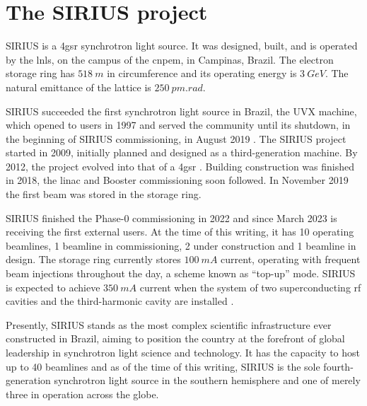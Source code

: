 \section*{The SIRIUS project}

SIRIUS is a \gls*{4gsr} synchrotron light source. It was designed, built, and is operated by the \gls*{lnls}, on the campus of the \gls*{cnpem}, in Campinas, Brazil. The electron storage ring has $518~\unit{m}$ in circumference and its operating energy is $3~\unit{GeV}$. The natural emittance of the lattice is $250~\unit{pm}.\unit{rad}$.

SIRIUS succeeded the first synchrotron light source in Brazil, the UVX machine, which opened to users in 1997 and served the community until its shutdown, in the beginning of SIRIUS commissioning, in August 2019
\cite{liu_synchrotron_2019}. The SIRIUS project started in 2009, initially planned and designed as a third-generation machine. By 2012, the project evolved into that of a \gls*{4gsr} \cite{liu_synchrotron_2019}. Building construction was finished in 2018, the \acrshort*{linac} and Booster commissioning soon followed. In November 2019 the first beam was stored in the storage ring.

SIRIUS finished the Phase-0 commissioning in 2022 and since March 2023 is receiving the first external users. At the time of this writing, it has 10 operating beamlines, 1 beamline in commissioning, 2 under construction and 1 beamline in design\cite{lnls_beamlines}. The storage ring currently stores $100~\unit{mA}$ current, operating with frequent beam injections throughout the day, a scheme known as ``top-up'' mode. SIRIUS is expected to achieve $350~\unit{mA}$ current when the system of two superconducting \gls*{rf} cavities and the third-harmonic cavity are installed \cite{liu_status_2022,liu_status_2023}.

Presently, SIRIUS stands as the most complex scientific infrastructure ever constructed in Brazil, aiming to position the country at the forefront of global leadership in synchrotron light science and technology. It has the capacity to host up to 40 beamlines and as of the time of this writing, SIRIUS is the sole fourth-generation synchrotron light source in the southern hemisphere and one of merely three  in operation across the globe.

